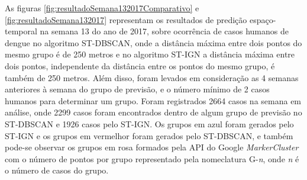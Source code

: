 

As figuras \ref{fig:resultadoSemana132017Comparativo} e \ref{fig:resultadoSemana132017} representam os resultados de predição espaço-temporal na semana 13 do ano de 2017, sobre ocorrência de casos humanos de dengue no algoritmo \acrshort{ST-DBSCAN}, onde a distância máxima entre dois pontos do mesmo grupo é de 250 metros e no algoritmo ST-IGN a distância máxima entre dois pontos, independente da distância entre os pontos do mesmo grupo, é também de 250 metros. Além disso, foram levados em consideração as 4 semanas anteriores à semana do grupo de previsão, e o número mínimo de 2 casos humanos para determinar um grupo. Foram registrados 2664 casos na semana em análise, onde 2299 casos foram encontrados dentro de algum grupo de previsão no ST-DBSCAN e 1926 casos pelo ST-IGN. Os grupos em azul foram gerados pelo ST-IGN e os grupos em vermelhor foram gerados pelo ST-DBSCAN, e também pode-se observar os grupos em rosa formados pela API do Google \emph{MarkerCluster} com o número de pontos por grupo representado pela nomeclatura G-\emph{n}, onde \emph{n} é o número de casos do grupo.

\begin{figure}[!ht]
	\centering	
\end{figure}
\FloatBarrier


